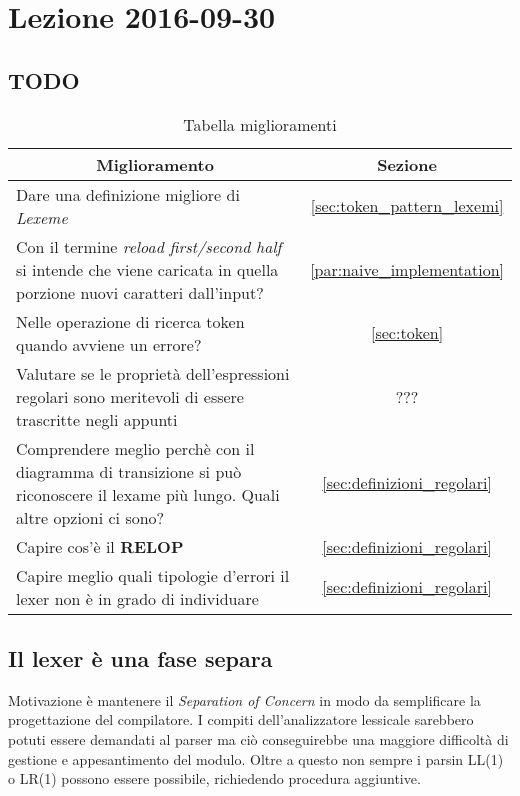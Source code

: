 \section{Lezione 2016-09-30}
\subsection{TODO}
\begin{table}[ht]
\begin{center}
\begin{tabular}{|p{\textwidth}|c|}
\hline
\multicolumn{1}{|c|}{\textbf{Miglioramento}} & \textbf{Sezione} \\ \hline
Dare una definizione migliore di \textit{Lexeme} &
\ref{sec:token_pattern_lexemi} \\ \hline
Con il termine \textit{reload first/second half} si intende che viene caricata
in quella porzione nuovi caratteri dall'input? &
\ref{par:naive_implementation} \\ \hline
Nelle operazione di ricerca token quando avviene un errore? &
\ref{sec:token} \\ \hline
Valutare se le proprietà dell'espressioni regolari sono meritevoli di essere
trascritte negli appunti & ??? \\ \hline
Comprendere meglio perchè con il diagramma di transizione si può riconoscere il
lexame più lungo. Quali altre opzioni ci sono? &
\ref{sec:definizioni_regolari} \\ \hline
Capire cos'è il \textbf{RELOP} & \ref{sec:definizioni_regolari} \\ \hline
Capire meglio quali tipologie d'errori il lexer non è in grado di individuare &
\ref{sec:definizioni_regolari} \\ \hline
\end{tabular}
\end{center}
\caption{Tabella miglioramenti}
\label{tab:tab_todo}
\end{table}

\subsection{Il lexer è una fase separa}
Motivazione è mantenere il \textit{Separation of Concern} in modo da
semplificare la progettazione del compilatore. I compiti dell'analizzatore
lessicale sarebbero potuti essere demandati al parser ma ciò conseguirebbe una
maggiore difficoltà di gestione e appesantimento del modulo. Oltre a questo non
sempre i parsin LL(1) o LR(1) possono essere possibile, richiedendo procedura
aggiuntive.


